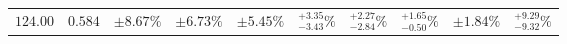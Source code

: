 \begin{table}[ht!]
{{\begin{tabular}{| cc | ccc | cccc | c |}
$124.00$ & $0.584$ & $\pm8.67\%$ & {\color{black!55}$\pm 6.73\%$} & {\color{black!55}$\pm 5.45\%$} & $^{+3.35}_{-3.43}\%$ & {\color{black!55}$^{+2.27}_{-2.84}\%$} & {\color{black!55}$^{+1.65}_{-0.50}\%$} & {\color{black!55}$\pm 1.84\%$} & $^{+9.29}_{-9.32}\%$  \\

\end{tabular}}}
\end{table}
